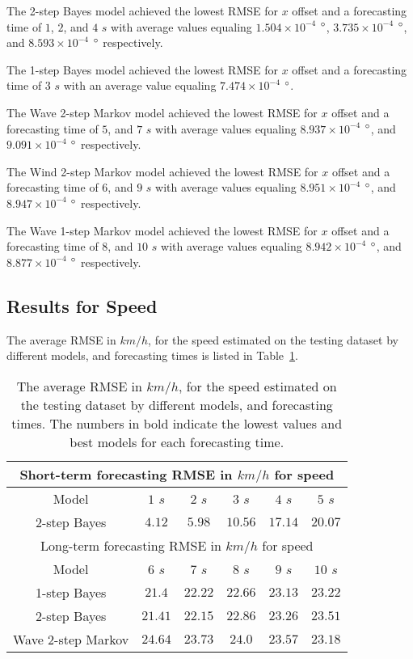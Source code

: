 \documentclass[preprint,12pt]{elsarticle}
\begin{document}
The 2-step Bayes model achieved the lowest RMSE for $x$ offset and a forecasting time of $1$, $2$, and $4$ $s$ with average values equaling $1.504 \times 10^{-4}$ $\degree$, $3.735 \times 10^{-4}$ $\degree$, and $8.593 \times 10^{-4}$ $\degree$ respectively.

The 1-step Bayes model achieved the lowest RMSE for $x$ offset and a forecasting time of $3$ $s$ with an average value equaling $7.474 \times 10^{-4}$ $\degree$.

The Wave 2-step Markov model achieved the lowest RMSE for $x$ offset and a forecasting time of $5$, and $7$ $s$ with average values equaling $8.937 \times 10^{-4}$ $\degree$, and $9.091 \times 10^{-4}$ $\degree$ respectively.

The Wind 2-step Markov model achieved the lowest RMSE for $x$ offset and a forecasting time of $6$, and $9$ $s$ with average values equaling $8.951 \times 10^{-4}$ $\degree$, and $8.947 \times 10^{-4}$ $\degree$ respectively.

The Wave 1-step Markov model achieved the lowest RMSE for $x$ offset and a forecasting time of $8$, and $10$ $s$ with average values equaling $8.942 \times 10^{-4}$ $\degree$, and $8.877 \times 10^{-4}$ $\degree$ respectively.

\subsection{Results for Speed}

The average RMSE in $km/h$, for the speed estimated on the testing dataset by different models, and forecasting times is listed in Table~\ref{tab:best_speed_RMSE}.

\begin{table}[!ht]
	\centering
	\begin{tabular}{|c|c|c|c|c|c|}
		\hline
		\multicolumn{6}{|c|}{Short-term forecasting RMSE in $km/h$ for speed} \\ \hline
		Model & $1$ $s$ & $2$ $s$ & $3$ $s$ & $4$ $s$ & $5$ $s$ \\ \hline
		2-step Bayes & $\mathbf{4.12}$ & $\mathbf{5.98}$ & $\mathbf{10.56}$ & $\mathbf{17.14}$ & $\mathbf{20.07}$ \\ \hline
		\multicolumn{6}{|c|}{Long-term forecasting RMSE in $km/h$ for speed} \\ \hline
		Model & $6$ $s$ & $7$ $s$ & $8$ $s$ & $9$ $s$ & $10$ $s$ \\ \hline
		1-step Bayes & $\mathbf{21.4}$ & $22.22$ & $\mathbf{22.66}$ & $\mathbf{23.13}$ & $23.22$ \\ \hline
		2-step Bayes & $21.41$ & $\mathbf{22.15}$ & $22.86$ & $23.26$ & $23.51$ \\ \hline
		Wave 2-step Markov & $24.64$ & $23.73$ & $24.0$ & $23.57$ & $\mathbf{23.18}$ \\ \hline
	\end{tabular}
	\caption{The average RMSE in $km/h$, for the speed estimated on the testing dataset by different models, and forecasting times. The numbers in bold indicate the lowest values and best models for each forecasting time.}
	\label{tab:best_speed_RMSE}
\end{table}
\end{document}
